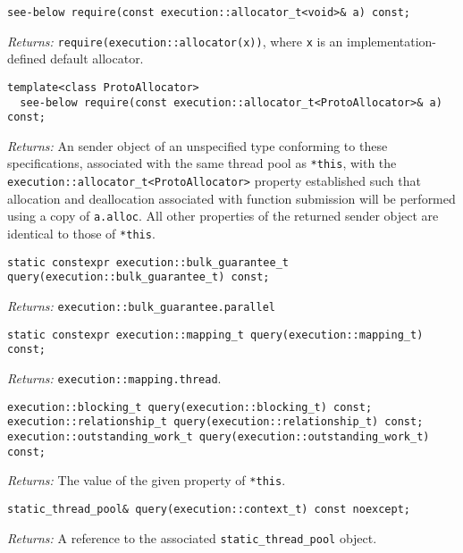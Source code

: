 \documentclass[a4paper,12pt,notitlepage,twoside,openright]{article}
\begin{document}
\begin{verbatim}
see-below require(const execution::allocator_t<void>& a) const;
\end{verbatim}

\emph{Returns:} \texttt{require(execution::allocator(x))},
where \texttt{x} is an implementation-defined default
allocator.

\begin{verbatim}
template<class ProtoAllocator>
  see-below require(const execution::allocator_t<ProtoAllocator>& a) const;
\end{verbatim}

\emph{Returns:} An sender object of an unspecified type conforming to
these specifications, associated with the same thread pool as
\texttt{*this}, with the
\texttt{execution::allocator_t<ProtoAllocator>} property
established such that allocation and deallocation associated with
function submission will be performed using a copy of
\texttt{a.alloc}. All other properties of the returned
sender object are identical to those of \texttt{*this}.

\begin{verbatim}
static constexpr execution::bulk_guarantee_t query(execution::bulk_guarantee_t) const;
\end{verbatim}

\emph{Returns:} \texttt{execution::bulk_guarantee.parallel}

\begin{verbatim}
static constexpr execution::mapping_t query(execution::mapping_t) const;
\end{verbatim}

\emph{Returns:} \texttt{execution::mapping.thread}.

\begin{verbatim}
execution::blocking_t query(execution::blocking_t) const;
execution::relationship_t query(execution::relationship_t) const;
execution::outstanding_work_t query(execution::outstanding_work_t) const;
\end{verbatim}

\emph{Returns:} The value of the given property of
\texttt{*this}.

\begin{verbatim}
static_thread_pool& query(execution::context_t) const noexcept;
\end{verbatim}

\emph{Returns:} A reference to the associated
\texttt{static_thread_pool} object.
\end{document}
